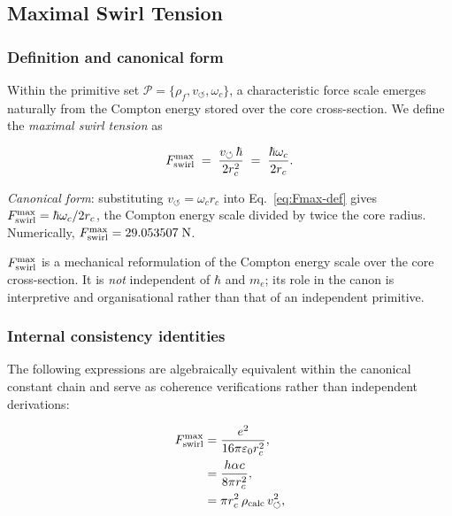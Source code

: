 
\subsection{Maximal Swirl Tension}
\label{sec:Fmax}

\subsubsection{Definition and canonical form}

Within the primitive set $\mathcal{P} = \{\rho_f, v_\circlearrowleft, \omega_c\}$,
a characteristic force scale emerges naturally from the Compton energy stored
over the core cross-section. We define the \emph{maximal swirl tension} as

\begin{equation}
  F_{\rm swirl}^{\max}
  \;=\; \frac{v_\circlearrowleft\,\hbar}{2r_c^2}
  \;=\; \frac{\hbar\omega_c}{2r_c}.
  \label{eq:Fmax-def}
\end{equation}

 \textit{Canonical form}: substituting
$v_\circlearrowleft = \omega_c r_c$ into Eq.~\eqref{eq:Fmax-def} gives
$F_{\rm swirl}^{\max} = \hbar\omega_c / 2r_c$,
the Compton energy scale divided by twice the core radius.
Numerically, $F_{\rm swirl}^{\max} = 29.053507\;\text{N}$.

 $F_{\rm swirl}^{\max}$ is a mechanical
reformulation of the Compton energy scale over the core cross-section.
It is \emph{not} independent of $\hbar$ and $m_e$; its role in the
canon is interpretive and organisational rather than that of an
independent primitive.

\subsubsection{Internal consistency identities}

The following expressions are algebraically equivalent within the
canonical constant chain and serve as coherence verifications rather
than independent derivations:

\begin{align}
  F_{\rm swirl}^{\max}
  &= \frac{e^2}{16\pi\varepsilon_0 r_c^2},
  \label{eq:Fmax-em}\\
  &= \frac{h\alpha c}{8\pi r_c^2},
  \label{eq:Fmax-hac}\\
  &= \pi r_c^2\,\rho_{\rm calc}\,v_\circlearrowleft^2,
  \label{eq:Fmax-rho}
\end{align}

